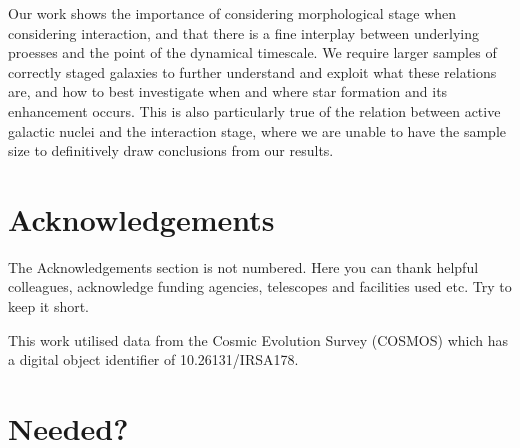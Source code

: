 \documentclass[fleqn,usenatbib]{mnras}
\begin{document}
Our work shows the importance of considering morphological stage when considering interaction, and that there is a fine interplay between underlying proesses and the point of the dynamical timescale. We require larger samples of correctly staged galaxies to further understand and exploit what these relations are, and how to best investigate when and where star formation and its enhancement occurs. This is also particularly true of the relation between active galactic nuclei and the interaction stage, where we are unable to have the sample size to definitively draw conclusions from our results.
 
\section*{Acknowledgements}
The Acknowledgements section is not numbered. Here you can thank helpful
colleagues, acknowledge funding agencies, telescopes and facilities used etc.
Try to keep it short.

This work utilised data from the Cosmic Evolution Survey (COSMOS) which has a digital object identifier of 10.26131/IRSA178.







\appendix

\section{Needed?}




\bsp	%
\label{lastpage}
\end{document}
